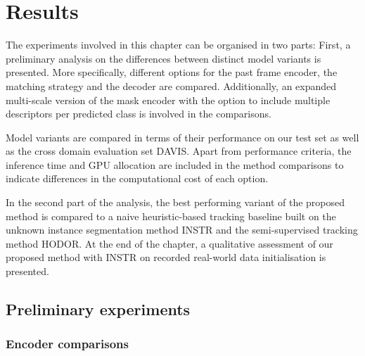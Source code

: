 \chapter{Results}\label{chapter:Results}


The experiments involved in this chapter can be organised in two parts: First, a preliminary analysis on the differences between distinct model variants is presented. More specifically, different options for the past frame encoder, the matching strategy and the decoder are compared. Additionally, an expanded multi-scale version of the mask encoder with the option to include multiple descriptors per predicted class is involved in the comparisons. \par

Model variants are compared in terms of their performance on our test set as well as the cross domain evaluation set DAVIS. Apart from performance criteria, the inference time and GPU allocation are included in the method comparisons to indicate differences in the computational cost of each option. \par 

In the second part of the analysis, the best performing variant of the proposed method is compared to a naive heuristic-based tracking baseline built on the unknown instance segmentation method INSTR and the semi-supervised tracking method HODOR. At the end of the chapter, a qualitative assessment of our proposed method with INSTR on recorded real-world data initialisation is presented.

\section{Preliminary experiments} \label{seq:preliminary_exps}


\subsection{Encoder comparisons}

